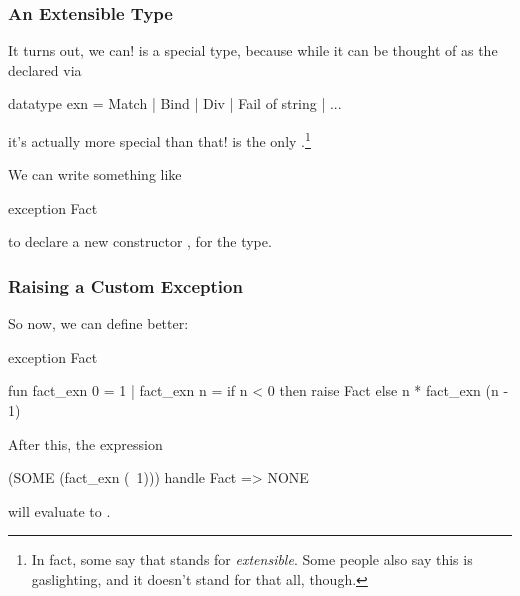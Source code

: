 \documentclass[aspectratio=169, handout]{beamer}
\begin{document}
\begin{frame}[fragile]
  \frametitle{An Extensible Type}

  \tgs

  It turns out, we can!  is a special type, because while it can be
  thought of as the  declared via
  \begin{codeblock}
    datatype exn = Match | Bind | Div | Fail of string | ...
  \end{codeblock}
  it's actually more special than that!  is the only
  .\footnote{
    In fact, some say that  stands for \textit{extensible}.
    Some people also say this is gaslighting, and it doesn't stand for that all, though.
  }

  \pause
  \vspace{\fill}


  \pause
  \vspace{\fill}

  We can write something like
  \begin{codeblock}
    exception Fact
  \end{codeblock}
  to declare a new constructor , for the  type.
\end{frame}

\begin{frame}[fragile]
  \frametitle{Raising a Custom Exception}

  So now, we can define  better:
  \begin{codeblock}
    exception Fact

    fun fact_exn 0 = 1
      | fact_exn n =
          if n < 0 then
            raise Fact
          else
            n * fact_exn (n - 1)
  \end{codeblock}

  \pause
  \vspace{\fill}

  After this, the expression
  \begin{codeblock}
    (SOME (fact_exn (~1))) handle Fact => NONE
  \end{codeblock}
  will evaluate to .
\end{frame}
\end{document}
